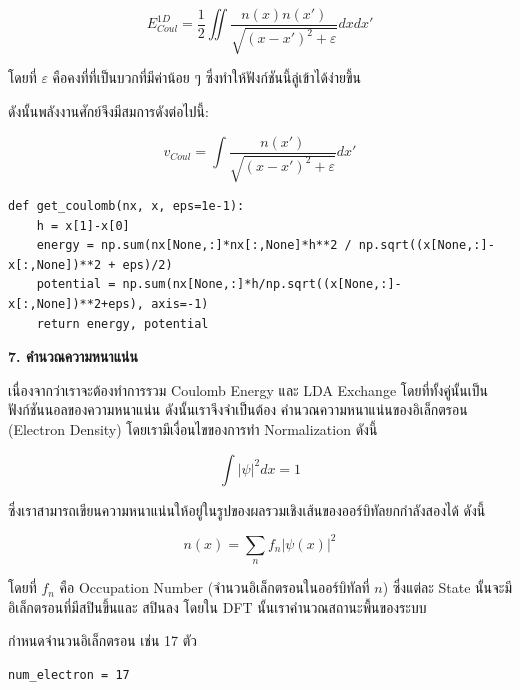 \begin{equation}
    E^{1D}_{Coul} = \frac{1}{2}\iint \frac{n(x)n(x')}{\sqrt{(x-x')^2+\varepsilon}}dxdx'
\end{equation}

\noindent โดยที่ $\varepsilon$ คือคงที่ที่เป็นบวกที่มีค่าน้อย ๆ ซึ่งทำให้ฟังก์ชันนี้ลู่เข้าได้ง่ายขึ้น

\noindent ดังนั้นพลังงานศักย์จึงมีสมการดังต่อไปนี้:

\begin{equation}
    v_{Coul} = \int \frac{n(x')}{\sqrt{(x-x')^2+\varepsilon}}dx'
\end{equation}

\vspace{1em}
\begin{lstlisting}[style=MyPython]
def get_coulomb(nx, x, eps=1e-1):
    h = x[1]-x[0]
    energy = np.sum(nx[None,:]*nx[:,None]*h**2 / np.sqrt((x[None,:]-x[:,None])**2 + eps)/2)
    potential = np.sum(nx[None,:]*h/np.sqrt((x[None,:]-x[:,None])**2+eps), axis=-1)
    return energy, potential
\end{lstlisting}

\vspace{1em}
\noindent \textbf{7. คำนวณความหนาแน่น}

เนื่องจากว่าเราจะต้องทำการรวม Coulomb Energy และ LDA Exchange โดยที่ทั้งคู่นั้นเป็นฟังก์ชันนอลของความหนาแน่น ดังนั้นเราจึงจำเป็นต้อง%
คำนวณความหนาแน่นของอิเล็กตรอน (Electron Density) โดยเรามีเงื่อนไขของการทำ Normalization ดังนี้

\begin{equation}
    \int \lvert \psi \rvert ^2 dx = 1
\end{equation}

\noindent ซึ่งเราสามารถเขียนความหนาแน่นให้อยู่ในรูปของผลรวมเชิงเส้นของออร์บิทัลยกกำลังสองได้ ดังนี้

\begin{equation}
    n(x) = \sum_n f_n \lvert \psi(x) \rvert ^2
\end{equation}

\noindent โดยที่ $f_n$ คือ Occupation Number (จำนวนอิเล็กตรอนในออร์บิทัลที่ $n$) ซึ่งแต่ละ State นั้นจะมีอิเล็กตรอนที่มีสปินขึ้นและ%
สปินลง โดยใน DFT นั้นเราคำนวณสถานะพื้นของระบบ

\noindent กำหนดจำนวนอิเล็กตรอน เช่น 17 ตัว

\begin{lstlisting}[style=MyPython]
num_electron = 17
\end{lstlisting}

